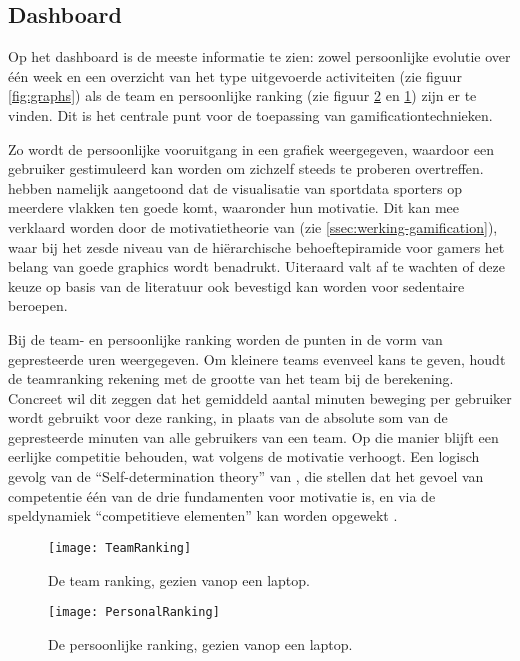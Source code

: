 \subsection{Dashboard}
Op het dashboard is de meeste informatie te zien: zowel persoonlijke evolutie over één week en een overzicht van het type uitgevoerde activiteiten (zie figuur \ref{fig:graphs}) als de team en persoonlijke ranking (zie figuur \ref{fig:personalRanking} en \ref{fig:teamRanking}) zijn er te vinden. Dit is het centrale punt voor de toepassing van gamificationtechnieken.

Zo wordt de persoonlijke vooruitgang in een grafiek weergegeven, waardoor een gebruiker gestimuleerd kan worden om zichzelf steeds te proberen overtreffen. \linebreak \textcite{Schiewe2020} hebben namelijk aangetoond dat de visualisatie van sportdata sporters op meerdere vlakken ten goede komt, waaronder hun motivatie. Dit kan mee verklaard worden door de motivatietheorie van \textcite{Siang2003} (zie \ref{ssec:werking-gamification}), waar bij het zesde niveau van de hiërarchische behoeftepiramide voor gamers het belang van goede graphics wordt benadrukt. Uiteraard valt af te wachten of deze keuze op basis van de literatuur ook bevestigd kan worden voor sedentaire beroepen.

Bij de team- en persoonlijke ranking worden de punten in de vorm van gepresteerde uren weergegeven. Om kleinere teams evenveel kans te geven, houdt de teamranking rekening met de grootte van het team bij de berekening. Concreet wil dit zeggen dat het gemiddeld aantal minuten beweging per gebruiker wordt gebruikt voor deze ranking, in plaats van de absolute som van de gepresteerde minuten van alle gebruikers van een team. Op die manier blijft een eerlijke competitie behouden, wat volgens \textcite{Ivanova2019} de motivatie verhoogt. Een logisch gevolg van de “Self-determination theory” van \textcite{Deci1985}, die stellen dat het gevoel van competentie één van de drie fundamenten voor motivatie is, en via de speldynamiek “competitieve elementen” kan worden opgewekt \autocite{Kam2018}.

\begin{figure}[h]
    \caption[Team ranking]{De team ranking, gezien vanop een laptop.}
    \texttt{[image: TeamRanking]}
    \label{fig:teamRanking}
\end{figure}

\begin{figure}[h]
    \caption[Persoonlijke ranking]{De persoonlijke ranking, gezien vanop een laptop.}
    \texttt{[image: PersonalRanking]}
    \label{fig:personalRanking}
\end{figure}

